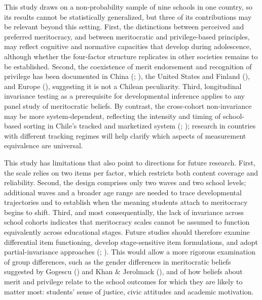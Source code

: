 \documentclass[
  11pt,
]{article}
\begin{document}
This study draws on a non-probability sample of nine schools in one
country, so its results cannot be statistically generalized, but three
of its contributions may be relevant beyond this setting. First, the
distinctions between perceived and preferred meritocracy, and between
meritocratic and privilege-based principles, may reflect cognitive and
normative capacities that develop during adolescence, although whether
the four-factor structure replicates in other societies remains to be
established. Second, the coexistence of merit endorsement and
recognition of privilege has been documented in China
(;
), the United
States and Finland (),
and Europe (), suggesting it is not a Chilean peculiarity. Third,
longitudinal invariance testing as a prerequisite for developmental
inference applies to any panel study of meritocratic beliefs. By
contrast, the cross-cohort non-invariance may be more system-dependent,
reflecting the intensity and timing of school-based sorting in Chile's
tracked and marketized system
(;
);
research in countries with different tracking regimes will help clarify
which aspects of measurement equivalence are universal.

This study has limitations that also point to directions for future
research. First, the scale relies on two items per factor, which
restricts both content coverage and reliability. Second, the design
comprises only two waves and two school levels; additional waves and a
broader age range are needed to trace developmental trajectories and to
establish when the meaning students attach to meritocracy begins to
shift. Third, and most consequentially, the lack of invariance across
school cohorts indicates that meritocracy scales cannot be assumed to
function equivalently across educational stages. Future studies should
therefore examine differential item functioning, develop stage-sensitive
item formulations, and adopt partial-invariance approaches
(;
).
This would allow a more rigorous examination of group differences, such
as the gender differences in meritocratic beliefs suggested by Gogescu
() and Khan \& Jerolmack
(), and of how beliefs about merit
and privilege relate to the school outcomes for which they are likely to
matter most: students' sense of justice, civic attitudes and academic
motivation.
\end{document}
